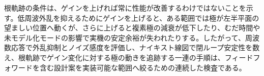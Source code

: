 根軌跡の条件は、ゲインを上げれば常に性能が改善するわけではないことを示す。低周波外乱を抑えるためにゲインを上げると、ある範囲では極が左半平面の望ましい位置へ動くが、さらに上げると複素極の減衰が低下したり、むだ時間や未モデル化モードの影響で実機の安定余裕が失われたりする。したがって、周波数応答で外乱抑制とノイズ感度を評価し、ナイキスト線図で閉ループ安定性を数え、根軌跡でゲイン変化に対する極の動きを追跡する一連の手順は、フィードフォワードを含む設計案を実装可能な範囲へ絞るための連続した検査である。
